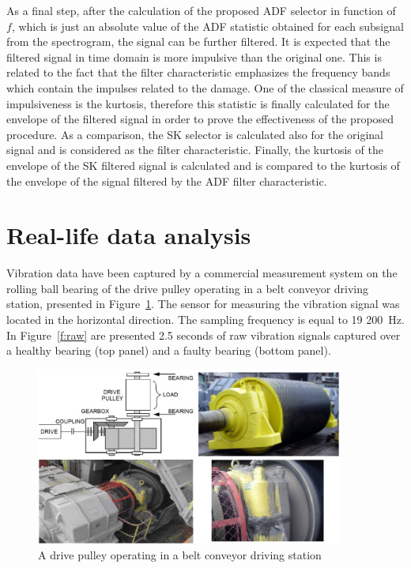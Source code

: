 \documentclass[11pt]{article}
\begin{document}
As a final step, after the calculation of the proposed ADF selector in function of $f$, which is just an absolute value of the ADF statistic obtained for each subsignal from the spectrogram, the signal can be further filtered.  It is expected that the filtered signal in time domain is more impulsive than the original one. This is related to the fact that the  filter characteristic emphasizes the frequency bands which contain the impulses related to the damage. One of the classical measure of impulsiveness is the kurtosis, therefore this statistic is finally calculated for the envelope of the filtered signal in order to prove the effectiveness of the proposed procedure. As a comparison, the SK selector is calculated also for the original signal and is considered as the filter characteristic. Finally, the kurtosis of the envelope of the SK filtered signal is calculated and is compared to the kurtosis of the envelope of the signal filtered by the ADF filter characteristic. 

\section{Real-life data analysis}

Vibration data have been captured by a commercial measurement system on the rolling ball bearing of the drive pulley operating in a belt conveyor driving station, presented in Figure~\ref{f:rl}. The sensor for measuring the vibration signal was located in the horizontal direction. The sampling frequency is equal to 19 200~Hz. In Figure~\ref{f:raw} are presented 2.5 seconds of raw vibration signals captured over a healthy bearing (top panel) and a faulty bearing (bottom panel).  

\begin{figure}[!ht]
\begin{center}
\includegraphics[width=0.9\textwidth]{gb.PNG}
\caption{A drive pulley operating in a belt conveyor driving station \label{f:rl}}
\end{center}
\end{figure}
\end{document}
